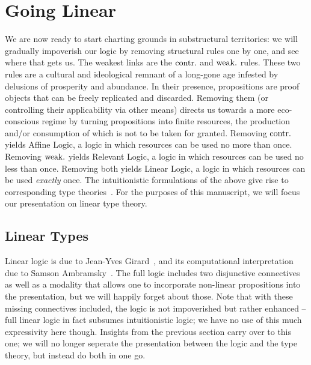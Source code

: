 \section{Going Linear}
We are now ready to start charting grounds in substructural territories: we will gradually impoverish our logic by removing structural rules one by one, and see where that gets us. 
The weakest links are the $\mathrm{contr.}{}$ and $\mathrm{weak.}{}$ rules.
These two rules are a cultural and ideological remnant of a long-gone age infested by delusions of prosperity and abundance.
In their presence, propositions are proof objects that can be freely replicated and discarded.
Removing them (or controlling their applicability via other means) directs us towards a more eco-conscious regime by turning propositions into finite resources, the production and/or consumption of which is not to be taken for granted.
Removing $\mathrm{contr.}{}$ yields Affine Logic, a logic in which resources can be used no more than once.
Removing $\mathrm{weak.}{}$ yields Relevant Logic, a logic in which resources can be used no less than once.
Removing both yields Linear Logic, a logic in which resources can be used \textit{exactly} once.
The intuitionistic formulations of the above give rise to corresponding type theories~\cite{pierce2004advanced}.
For the purposes of this manuscript, we will focus our presentation on linear type theory.

\subsection{Linear Types}
Linear logic is due to Jean-Yves Girard~\cite{girard1987linear}, and its computational interpretation due to Samson Ambramsky~\cite{abramsky1993computational}.
The full logic includes two disjunctive connectives as well as a modality that allows one to incorporate non-linear propositions into the presentation, but we will happily forget about those.
Note that with these missing connectives included, the logic is not impoverished but rather enhanced -- full linear logic in fact subsumes intuitionistic logic; we have no use of this much expressivity here though.
Insights from the previous section carry over to this one; we will no longer seperate the presentation between the logic and the type theory, but instead do both in one go.


